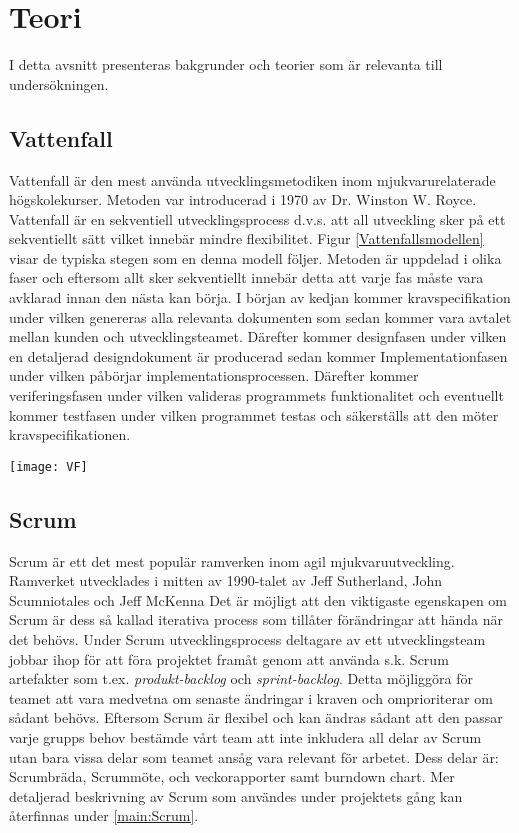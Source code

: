 \section{Teori} \label{sec:Lieth_Wahid-theory}
I detta avsnitt presenteras bakgrunder och teorier som är relevanta till undersökningen. 
\subsection{Vattenfall}
Vattenfall är den mest använda utvecklingsmetodiken inom mjukvarurelaterade högskolekurser. Metoden var introducerad i 1970 \cite{WaterfalM} av Dr. Winston W. Royce. \cite{managing} Vattenfall är en sekventiell utvecklingsprocess d.v.s. att all utveckling sker på ett sekventiellt sätt vilket innebär mindre flexibilitet. Figur \ref{Vattenfallsmodellen} visar de typiska 
stegen som en denna modell följer. Metoden är uppdelad i olika faser och eftersom allt sker sekventiellt innebär detta att varje fas måste vara avklarad innan den nästa kan börja.  I början av kedjan kommer kravspecifikation under vilken genereras alla relevanta dokumenten som sedan kommer vara avtalet mellan kunden och utvecklingsteamet. \cite{GameDesign} Därefter kommer designfasen under vilken en detaljerad designdokument är producerad sedan kommer Implementationfasen under vilken påbörjar implementationsprocessen. Därefter kommer veriferingsfasen under vilken valideras programmets funktionalitet och eventuellt kommer testfasen under vilken programmet testas och säkerställs att den möter kravspecifikationen.
\begin{figure*}[h]
	\centering
	\texttt{[image: VF]}
	\caption{Vattenfallsmodellen\cite{theWaterFall}}
	\label{Vattenfallsmodellen}
\end{figure*}
\subsection{Scrum}
Scrum är ett det mest populär ramverken inom agil mjukvaruutveckling. Ramverket utvecklades i mitten av 1990-talet av Jeff Sutherland, John Scumniotales och Jeff McKenna Det är möjligt att den viktigaste egenskapen om Scrum är dess så kallad iterativa process som tillåter förändringar att hända när det behövs. Under Scrum utvecklingsprocess deltagare av ett utvecklingsteam jobbar ihop för att föra projektet framåt genom att använda s.k. Scrum artefakter som t.ex. \textit{produkt-backlog} och \textit{sprint-backlog}. Detta möjliggöra för teamet att vara medvetna om senaste ändringar i kraven och omprioriterar om sådant behövs.  \cite{aamir2017incorporating} Eftersom Scrum är flexibel och kan ändras sådant att den passar varje grupps behov bestämde vårt team att inte inkludera all delar av Scrum utan bara vissa delar som teamet ansåg vara relevant för arbetet. Dess delar är:
Scrumbräda, Scrummöte, och veckorapporter samt burndown chart. Mer detaljerad beskrivning av Scrum som användes under projektets gång kan återfinnas under
\ref{main:Scrum}.
